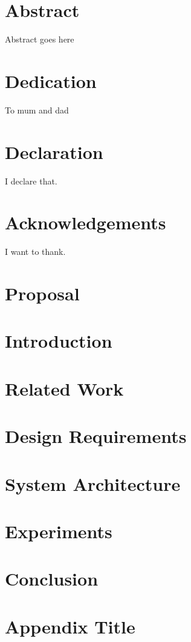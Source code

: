 \documentclass[12pt]{book}
\begin{document}
\chapter*{Abstract}
Abstract goes here

\chapter*{Dedication}
To mum and dad

\chapter*{Declaration}
I declare that.

\chapter*{Acknowledgements}
I want to thank.

\tableofcontents

\chapter{Proposal}


\chapter{Introduction}


\chapter{Related Work}


\chapter{Design Requirements}


\chapter{System Architecture}


\chapter{Experiments}


\chapter{Conclusion}


\appendix
\chapter{Appendix Title}

\end{document}
